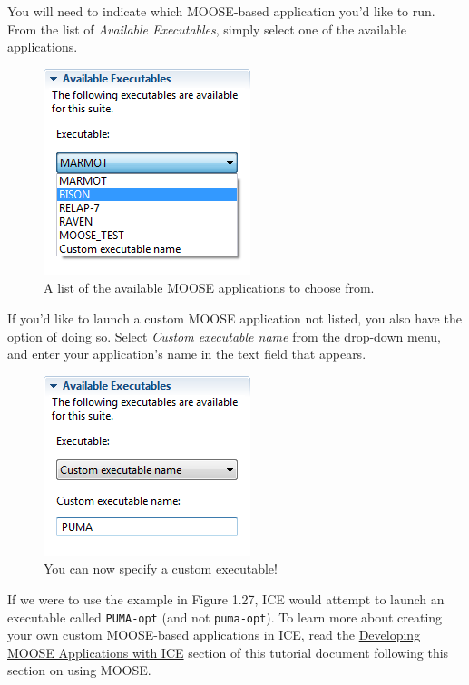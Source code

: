 You will need to indicate which MOOSE-based application you'd like to
run. From the list of \emph{Available Executables}, simply select one of
the available applications.

\begin{figure}[htbp]
\centering
\includegraphics{figures/ICE_MOOSEAvailableExecutables.png}
\caption{A list of the available MOOSE applications to choose from.}
\end{figure}

If you'd like to launch a custom MOOSE application not listed, you also
have the option of doing so. Select \emph{Custom executable name} from
the drop-down menu, and enter your application's name in the text field
that appears.

\begin{figure}[htbp]
\centering
\includegraphics{figures/ICE_MOOSELauncherCustomExecutable.png}
\caption{You can now specify a custom executable!}
\end{figure}

If we were to use the example in Figure 1.27, ICE would attempt to launch an
executable called \texttt{PUMA-opt} (and not \texttt{puma-opt}). To
learn more about creating your own custom MOOSE-based applications in ICE, read
the \href{Developing MOOSE Applications with ICE}{Developing MOOSE
Applications with ICE} section of this tutorial document following this section on using MOOSE.

